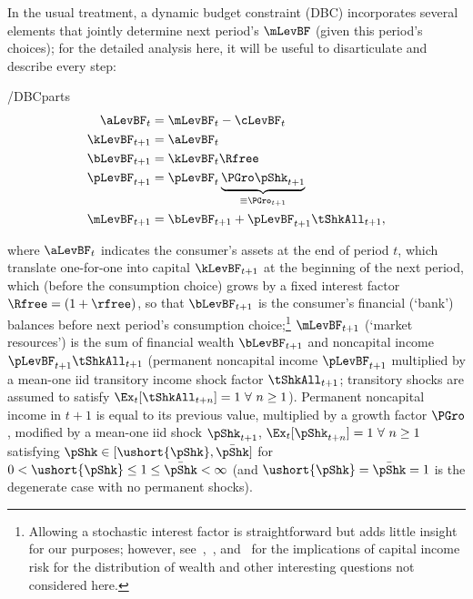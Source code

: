 \documentclass[BufferStockTheory]{subfiles}
\begin{document}
In the usual treatment, a dynamic budget constraint (DBC) incorporates
several elements that jointly determine next period's $\mLevBF$ (given this
period's choices); for the detailed analysis here, it will be useful to
disarticulate and describe every step:\hypertarget{DBCParts}{}
\begin{verbatimwrite}{\EqDir/DBCparts}
  \begin{equation} \label{eq:DBCparts}
    \begin{split}
      \aLevBF_{t}    & = \mLevBF_{t}-\cLevBF_{t}  \\
      \kLevBF_{t+1}   & = \aLevBF_{t} \\
      \bLevBF_{t+1}    & = \kLevBF_{t} \Rfree \\
      \pLevBF_{t+1}  & = \pLevBF_{t} \underbrace{\PGro\pShk_{t+1}}_{\equiv \PGro_{t+1}}  \\
      \mLevBF_{t+1}  & =  \bLevBF_{t+1} +\pLevBF_{t+1}\tShkAll_{t+1}, 
    \end{split}
  \end{equation}
\end{verbatimwrite}

where $\aLevBF_{t}$ indicates the consumer's assets at the end of period $t$, which translate one-for-one into capital $\kLevBF_{t+1}$ at the beginning of the next period, which (before the consumption choice) grows by a fixed interest factor $\Rfree =(1+\rfree)$,  so that $\bLevBF_{t+1}$ is the consumer's financial (`bank') balances before next period's consumption choice;\footnote{Allowing a stochastic interest factor is straightforward but adds little insight for our purposes; however, see~\cite{benhabibWealth},~\cite{maTodaRich}, and~\cite{mstIncFluct} for the implications of capital income risk for the distribution of wealth and other interesting questions not considered here.} $\mLevBF_{t+1}$ (`market resources') is the sum of financial wealth $\bLevBF_{t+1}$ and noncapital income $\pLevBF_{t+1}\tShkAll_{t+1}$ (permanent noncapital income $\pLevBF_{t+1}$ multiplied by a mean-one iid transitory income shock factor $\tShkAll_{t+1}$; transitory shocks are assumed to satisfy $\Ex_{t}[{\tShkAll}_{t+n}]=1~\forall~n\geq 1$). Permanent noncapital income in $t+1$ is equal to its previous value, multiplied by a growth factor $\PGro$, modified by a mean-one iid shock $\pShk_{t+1}$, $\Ex_{t}[{\pShk}_{t+n}]=1~\forall~n \geq 1$ satisfying $\pShk \in [\ushort{\pShk},\bar{\pShk}]$ for $0 < \ushort{\pShk} \leq 1 \leq \bar{\pShk} < \infty$ (and $\ushort{\pShk}=\bar{\pShk}=1$ is the degenerate case with no permanent shocks).
\end{document}
